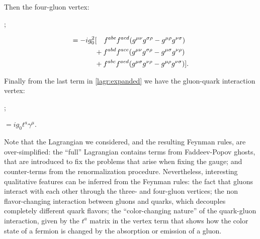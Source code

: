 Then the four-gluon vertex:
\begin{center}
    \begin{minipage}{0.4\textwidth}
        \hspace{2cm};
    \end{minipage}
    \begin{minipage}{0.58\textwidth}
        \begin{align}\nonumber = -ig_0^2&
        [~~~f^{abe}f^{acd}(g^{\mu\nu}g^{\sigma\rho} - g^{\mu\rho}g^{\nu\sigma}) \hfill \\\nonumber
        &+f^{abd}f^{ace}(g^{\mu\nu}g^{\sigma\rho} - g^{\mu\sigma}g^{\nu\rho})\hfill  \\\nonumber 
        &+f^{abc}f^{aed}(g^{\mu\sigma}g^{\nu\rho} - g^{\mu\rho}g^{\nu\sigma})].\hfill 
        \end{align}
    \end{minipage}
\end{center}
Finally from the last term in \cref{lagr:expanded} we have the gluon-quark interaction vertex:
\begin{center}
    \begin{minipage}{0.4\textwidth}
        \hspace{2cm};
    \end{minipage}
    \begin{minipage}{0.58\textwidth}
        \hspace{1.8cm} $ = ig_0t^a\gamma^\mu$.
    \end{minipage}
\end{center} 
Note that the Lagrangian we considered, and the resulting Feynman rules, are over-simplified: the ``full'' Lagrangian contains terms from Faddeev-Popov ghosts, that are introduced to fix the problems that arise when fixing the gauge; and counter-terms from the renormalization procedure\cite{peskin}. Nevertheless, interesting qualitative features can be inferred from the Feynman rules: the fact that gluons interact with each other through the three- and four-gluon vertices; the non flavor-changing interaction between gluons and quarks, which decouples completely different quark flavors; the ``color-changing nature'' of the quark-gluon interaction, given by the $t^a$ matrix in the vertex term that shows how the color state of a fermion is changed by the absorption or emission of a gluon.\\
 

